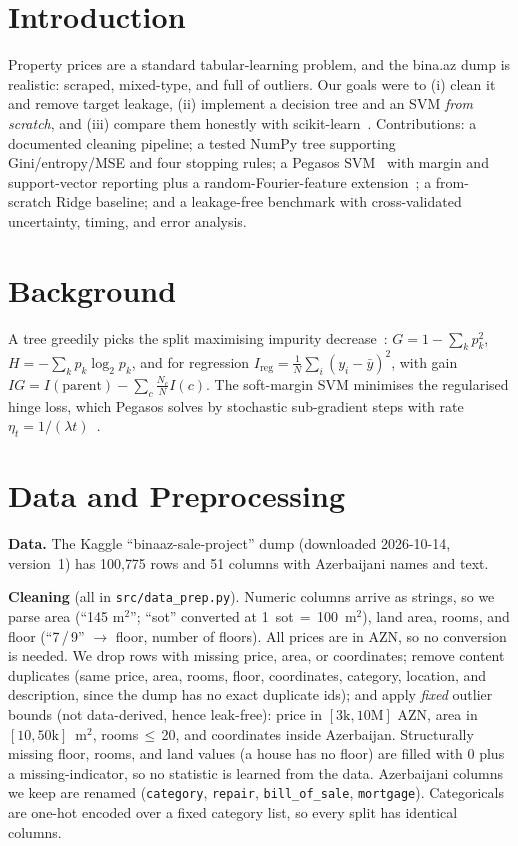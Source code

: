\documentclass[10pt,twocolumn,a4paper]{article}
\begin{document}
\section{Introduction}
Property prices are a standard tabular-learning problem, and the bina.az dump is
realistic: scraped, mixed-type, and full of outliers. Our goals were to
(i) clean it and remove target leakage, (ii) implement a decision tree and an SVM
\emph{from scratch}, and (iii) compare them honestly with scikit-learn~\cite{sklearn}.
Contributions: a documented cleaning pipeline; a tested NumPy tree supporting
Gini/entropy/MSE and four stopping rules; a Pegasos SVM~\cite{pegasos} with margin
and support-vector reporting plus a random-Fourier-feature extension~\cite{rff};
a from-scratch Ridge baseline; and a leakage-free benchmark with
cross-validated uncertainty, timing, and error analysis.

\section{Background}
A tree greedily picks the split maximising impurity decrease~\cite{cart}:
$G=1-\sum_k p_k^2$, $H=-\sum_k p_k\log_2 p_k$, and for regression
$I_\text{reg}=\frac1N\sum_i(y_i-\bar y)^2$, with gain
$IG=I(\text{parent})-\sum_c\frac{N_c}{N}I(c)$.
The soft-margin SVM minimises the regularised hinge loss, which Pegasos
solves by stochastic sub-gradient steps with rate $\eta_t=1/(\lambda t)$~\cite{pegasos}.

\section{Data and Preprocessing}
\textbf{Data.} The Kaggle ``binaaz-sale-project'' dump (downloaded 2026-10-14,
version~1) has 100{,}775 rows and 51 columns with Azerbaijani names and text.

\textbf{Cleaning} (all in \texttt{src/data\_prep.py}). Numeric columns arrive as
strings, so we parse area (``145 m$^2$''; ``sot'' converted at 1~sot\,$=$\,100~m$^2$),
land area, rooms, and floor (``7\,/\,9'' $\to$ floor, number of floors). All prices
are in AZN, so no conversion is needed. We drop rows with missing price, area, or
coordinates; remove content duplicates (same price, area, rooms, floor, coordinates,
category, location, and description, since the dump has no exact duplicate ids);
and apply \emph{fixed} outlier bounds (not data-derived, hence leak-free):
price in $[3\text{k},10\text{M}]$ AZN, area in $[10,50\text{k}]$~m$^2$, rooms\,$\le$\,20,
and coordinates inside Azerbaijan. Structurally missing floor, rooms, and land
values (a house has no floor) are filled with 0 plus a missing-indicator, so no
statistic is learned from the data. Azerbaijani columns we keep are renamed
(\texttt{category}, \texttt{repair}, \texttt{bill\_of\_sale}, \texttt{mortgage}).
Categoricals are one-hot encoded over a fixed category list, so every split has
identical columns.
\end{document}
